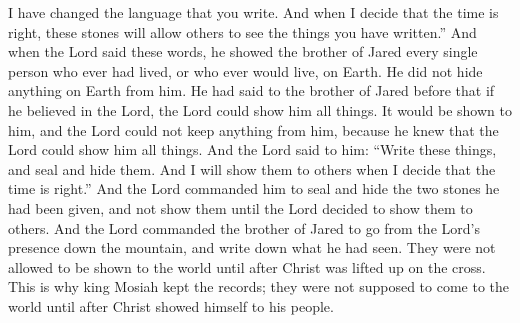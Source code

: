 I have changed the language that you write. And when I decide that the time is right, these stones will allow others to see the things you have written.''
\bverse \iffalse And when the Lord had said these words, he showed unto the brother of Jared all the inhabitants of the earth which had been, and also all that would be; and he withheld them not from his sight, even unto the ends of the earth. \fi
And when the Lord said these words, he showed the brother of Jared every single person who ever had lived, or who ever would live, on Earth. He did not hide anything on Earth from him.
\bverse \iffalse For he had said unto him in times before, that if he would believe in him that he could show unto him all things--it should be shown unto him; therefore the Lord could not withhold anything from him, for he knew that the Lord could show him all things. \fi
He had said to the brother of Jared before that if he believed in the Lord, the Lord could show him all things. It would be shown to him, and the Lord could not keep anything from him, because he knew that the Lord could show him all things.
\bverse \iffalse And the Lord said unto him: Write these things and seal them up; and I will show them in mine own due time unto the children of men. \fi
And the Lord said to him: ``Write these things, and seal and hide them. And I will show them to others when I decide that the time is right.''
\bverse \iffalse And it came to pass that the Lord commanded him that he should seal up the two stones which he had received, and show them not, until the Lord should show them unto the children of men. \fi
And the Lord commanded him to seal and hide the two stones he had been given, and not show them until the Lord decided to show them to others.
\bchapter
\bverse \iffalse And the Lord commanded the brother of Jared to go down out of the mount from the presence of the Lord, and write the things which he had seen; and they were forbidden to come unto the children of men until after that he should be lifted up upon the cross; and for this cause did king Mosiah keep them, that they should not come unto the world until after Christ should show himself unto his people. \fi
And the Lord commanded the brother of Jared to go from the Lord's presence down the mountain, and write down what he had seen. They were not allowed to be shown to the world until after Christ was lifted up on the cross. This is why king Mosiah kept the records; they were not supposed to come to the world until after Christ showed himself to his people.
